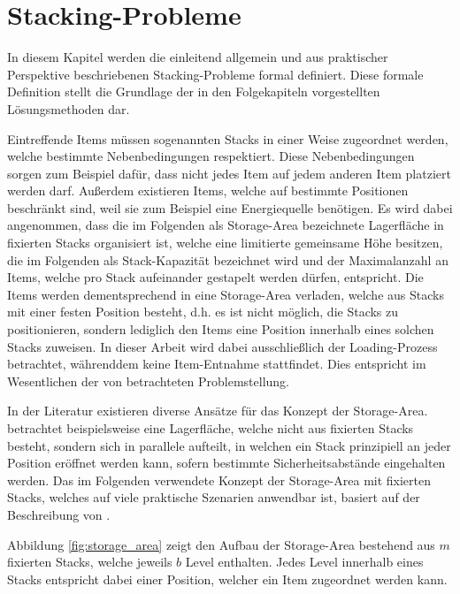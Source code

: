 \section{Stacking-Probleme}
\label{sec:stacking_problems}

In diesem Kapitel werden die einleitend allgemein und aus praktischer Perspektive beschriebenen Stacking-Probleme
formal definiert. Diese formale Definition stellt die Grundlage der in den Folgekapiteln vorgestellten Lösungsmethoden dar.

Eintreffende Items müssen sogenannten Stacks in einer Weise zugeordnet werden, welche bestimmte Nebenbedingungen respektiert.
Diese Nebenbedingungen sorgen zum Beispiel dafür, dass nicht jedes Item auf jedem anderen Item platziert werden
darf. Außerdem existieren Items, welche auf bestimmte Positionen beschränkt sind, weil sie zum Beispiel eine Energiequelle benötigen. Es wird dabei angenommen, dass die im Folgenden als Storage-Area bezeichnete Lagerfläche in fixierten
Stacks organisiert ist, welche eine limitierte gemeinsame Höhe besitzen, die im Folgenden als Stack-Kapazität bezeichnet wird
und der Maximalanzahl an Items, welche pro Stack aufeinander gestapelt werden dürfen, entspricht.
Die Items werden dementsprechend in eine Storage-Area verladen, welche aus Stacks mit einer festen Position besteht,
d.h. es ist nicht möglich, die Stacks zu positionieren, sondern lediglich den Items eine Position innerhalb eines solchen
Stacks zuweisen. In dieser Arbeit wird dabei ausschließlich der Loading-Prozess betrachtet, währenddem keine
Item-Entnahme stattfindet. Dies entspricht im Wesentlichen der von \citet{Bruns2015} betrachteten Problemstellung.

In der Literatur existieren diverse Ansätze für das Konzept der Storage-Area.
\citet{Jaehn2013} betrachtet beispielsweise eine Lagerfläche, welche nicht aus fixierten Stacks besteht,
sondern sich in parallele 
aufteilt, in welchen ein Stack prinzipiell an jeder Position eröffnet werden kann, sofern bestimmte Sicherheitsabstände eingehalten werden.
Das im Folgenden verwendete Konzept der Storage-Area mit fixierten Stacks, welches auf viele praktische
Szenarien anwendbar ist, basiert auf der Beschreibung von \citet{Lehnfeld2014}.

Abbildung \ref{fig:storage_area} zeigt den Aufbau der Storage-Area bestehend aus $m$ fixierten
Stacks, welche jeweils $b$ Level enthalten. Jedes Level innerhalb eines Stacks entspricht dabei einer Position,
welcher ein Item zugeordnet werden kann.

